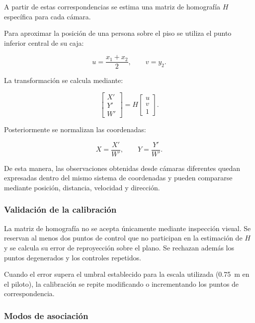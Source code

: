 \documentclass[12pt,letterpaper]{article}
\begin{document}
A partir de estas correspondencias se estima una matriz de homografía
$H$ específica para cada cámara.

Para aproximar la posición de una persona sobre el piso se utiliza el
punto inferior central de su caja:

\begin{equation}
u=\frac{x_1+x_2}{2},
\qquad
v=y_2.
\end{equation}

La transformación se calcula mediante:

\begin{equation}
\begin{bmatrix}
X'\\
Y'\\
W'
\end{bmatrix}
=
H
\begin{bmatrix}
u\\
v\\
1
\end{bmatrix}.
\end{equation}

Posteriormente se normalizan las coordenadas:

\begin{equation}
X=\frac{X'}{W'},
\qquad
Y=\frac{Y'}{W'}.
\end{equation}

De esta manera, las observaciones obtenidas desde cámaras diferentes
quedan expresadas dentro del mismo sistema de coordenadas y pueden
compararse mediante posición, distancia, velocidad y dirección.

\subsubsection{Validación de la calibración}

La matriz de homografía no se acepta únicamente mediante inspección
visual. Se reservan al menos dos puntos de control que no participan en
la estimación de $H$ y se calcula su error de reproyección sobre el
plano. Se rechazan además los puntos degenerados y los controles
repetidos.

Cuando el error supera el umbral establecido para la escala utilizada
(0.75~m en el piloto), la calibración se repite modificando o
incrementando los puntos de correspondencia.

\subsubsection{Modos de asociación}
\end{document}
